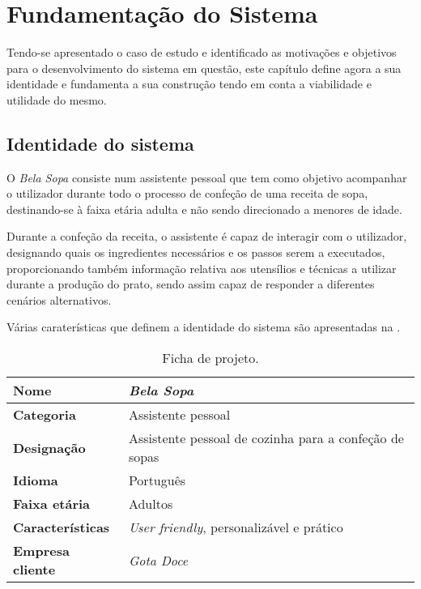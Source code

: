 
\section{Fundamentação do Sistema}
\label{cap:fundamentacao}

Tendo-se apresentado o caso de estudo e identificado as motivações e objetivos para o desenvolvimento do sistema em questão, este capítulo define agora a sua identidade e fundamenta a sua construção tendo em conta a viabilidade e utilidade do mesmo.


\subsection{Identidade do sistema}
\label{sec:fundamentacao:identidade}

O \emph{Bela Sopa} consiste num assistente pessoal que tem como objetivo acompanhar o utilizador durante todo o processo de confeção de uma receita de sopa, destinando-se à faixa etária adulta e não sendo direcionado a menores de idade.

Durante a confeção da receita, o assistente é capaz de interagir com o utilizador, designando quais os ingredientes necessários e os passos serem a executados, proporcionando também informação relativa aos utensílios e técnicas a utilizar durante a produção do prato, sendo assim capaz de responder a diferentes cenários alternativos.

Várias caraterísticas que definem a identidade do sistema são apresentadas na .

\begin{table}[ht]
  \centering
  \begin{tabular}{ | l | l | }
    \hline
    \textbf{Nome} & \emph{Bela Sopa} \\ \hline
    \textbf{Categoria} & Assistente pessoal \\ \hline
    \textbf{Designação} & Assistente pessoal de cozinha para a confeção de sopas \\ \hline
    \textbf{Idioma} & Português \\ \hline
    \textbf{Faixa etária} & Adultos \\ \hline
    \textbf{Características} & \emph{User friendly}, personalizável e prático\\ \hline
    \textbf{Empresa cliente} & \emph{Gota Doce} \\ \hline
  \end{tabular}
  \caption{Ficha de projeto.}
  \label{tab:fundamentacao:identidade}
\end{table}

